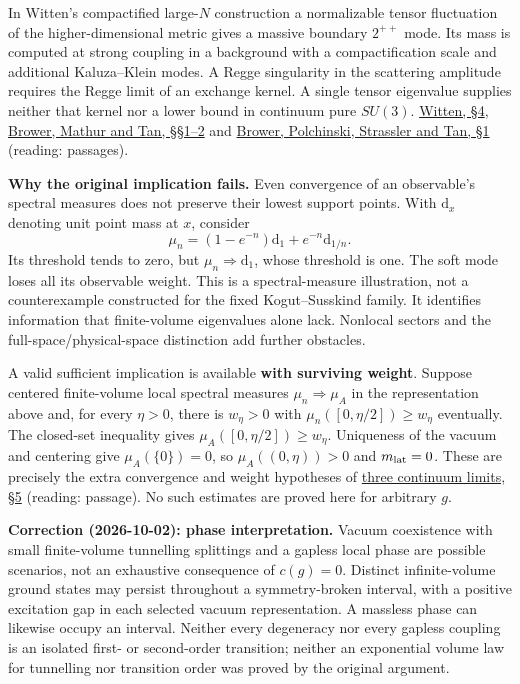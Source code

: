 \documentclass[11pt,a4paper]{article}
\begin{document}
In Witten's compactified large-\(N\) construction a normalizable tensor
fluctuation of the higher-dimensional metric gives a massive boundary
\(2^{++}\) mode. Its mass is computed at strong coupling in a background
with a compactification scale and additional Kaluza--Klein modes. A
Regge singularity in the scattering amplitude requires the Regge limit
of an exchange kernel. A single tensor eigenvalue supplies neither that
kernel nor a lower bound in continuum pure \(SU(3)\).
\href{https://arxiv.org/pdf/hep-th/9803131}{Witten, §4},
\href{https://arxiv.org/pdf/hep-th/0003115}{Brower, Mathur and Tan,
§§1--2} and \href{https://arxiv.org/pdf/hep-th/0603115}{Brower,
Polchinski, Strassler and Tan, §1} (reading: passages).

\textbf{Why the original implication fails.} Even convergence of an
observable's spectral measures does not preserve their lowest support
points. With \(\mathrm d_x\) denoting unit point mass at \(x\), consider
\[\mu_n=(1-e^{-n})\mathrm d_1+e^{-n}\mathrm d_{1/n}.
\] Its threshold tends to zero, but \(\mu_n\Rightarrow\mathrm d_1\),
whose threshold is one. The soft mode loses all its observable weight.
This is a spectral-measure illustration, not a counterexample
constructed for the fixed Kogut--Susskind family. It identifies
information that finite-volume eigenvalues alone lack. Nonlocal sectors
and the full-space/physical-space distinction add further obstacles.

A valid sufficient implication is available \textbf{with surviving
weight}. Suppose centered finite-volume local spectral measures
\(\mu_n\Rightarrow\mu_A\) in the representation above and, for every
\(\eta>0\), there is \(w_\eta>0\) with \(\mu_n([0,\eta/2])\ge w_\eta\)
eventually. The closed-set inequality gives
\(\mu_A([0,\eta/2])\ge w_\eta\). Uniqueness of the vacuum and centering
give \(\mu_A(\{0\})=0\), so \(\mu_A((0,\eta))>0\) and \(m_{\rm lat}=0\).
These are precisely the extra convergence and weight hypotheses of
\href{three-continuum-limits.md}{three continuum limits, §5} (reading:
passage). No such estimates are proved here for arbitrary \(g\).

\textbf{Correction (2026-10-02): phase interpretation.} Vacuum
coexistence with small finite-volume tunnelling splittings and a gapless
local phase are possible scenarios, not an exhaustive consequence of
\(c(g)=0\). Distinct infinite-volume ground states may persist
throughout a symmetry-broken interval, with a positive excitation gap in
each selected vacuum representation. A massless phase can likewise
occupy an interval. Neither every degeneracy nor every gapless coupling
is an isolated first- or second-order transition; neither an exponential
volume law for tunnelling nor transition order was proved by the
original argument.
\end{document}
